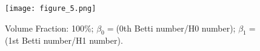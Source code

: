 \begin{figure}
\texttt{[image: figure\_5.png]}
\caption{Volume Fraction: 100\%; $\beta_0 = $(0th Betti number/H0 number); $\beta_1 = $(1st Betti number/H1 number).}
\end{figure}